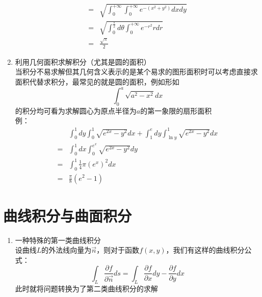 \documentclass[12pt,a4paper,UTF8]{book}
\begin{document}
\begin{enumerate}
\[\begin{aligned}
=&\sqrt{\int_{0}^{+\infty}\int_{0}^{+\infty}e^{-\left(x^2+y^2\right)}dxdy}\\
=&\sqrt{\int_{0}^{\frac{\pi}{2}}d\theta\int_{0}^{+\infty}e^{-r^2}rdr}\\
=&\frac{\sqrt{\pi}}{2}
\end{aligned}\]
\item 利用几何面积求解积分（尤其是圆的面积）\\
当积分不易求解但其几何含义表示的是某个易求的图形面积时可以考虑直接求面积代替求积分，最常见的就是圆的面积，例如形如
\[\int_{0}^{a}\sqrt{a^2-x^2}dx\]
的积分均可看为求解圆心为原点半径为$a$的第一象限的扇形面积\\
例：
\[\begin{aligned}
&\int_{0}^{1}dy\int_{0}^{1}\sqrt{e^{2x}-y^2}dx+\int_{1}^{e}dy\int_{\ln y}^{1}\sqrt{e^{2x}-y^2}dx\\
=&\int_{0}^{1}dx\int_{0}^{e^x}\sqrt{e^{2x}-y^2}dy\\
=&\int_{0}^{1}\frac{1}{4}\pi\left(e^x\right)^2dx\\
=&\frac{\pi}{8}\left(e^2-1\right)
\end{aligned}\]
\end{enumerate}


\section{曲线积分与曲面积分}
\begin{enumerate}
\item 一种特殊的第一类曲线积分\\
设曲线$L$的外法线向量为$\vec{n}$，则对于函数$f\left(x,y\right)$，我们有这样的曲线积分公式：
\[\int_{L}\frac{\partial f}{\partial\vec{n}}ds=\int_{L}\frac{\partial f}{\partial x}dy-\frac{\partial f}{\partial y}dx\]
此时就将问题转换为了第二类曲线积分的求解
\end{enumerate}
\end{document}
